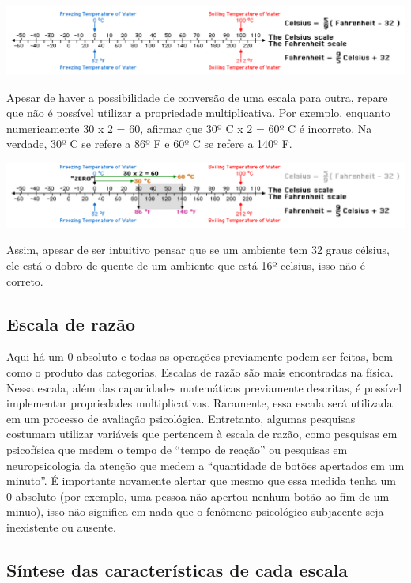 \documentclass[
]{book}
\begin{document}
\includegraphics{./img/cap_escala_medida_farenheit1.png}

Apesar de haver a possibilidade de conversão de uma escala para outra,
repare que não é possível utilizar a propriedade multiplicativa. Por
exemplo, enquanto numericamente 30 x 2 = 60, afirmar que 30º C x 2 = 60º
C é incorreto. Na verdade, 30º C se refere a 86º F e 60º C se refere a
140º F.

\includegraphics{./img/cap_escala_medida_farenheit2.png}

Assim, apesar de ser intuitivo pensar que se um ambiente tem 32 graus
célsius, ele está o dobro de quente de um ambiente que está 16º celsius,
isso não é correto.

\hypertarget{escala-de-razuxe3o}{%
\subsection{Escala de razão}\label{escala-de-razuxe3o}}

Aqui há um 0 absoluto e todas as operações previamente podem ser feitas,
bem como o produto das categorias. Escalas de razão são mais encontradas
na física. Nessa escala, além das capacidades matemáticas previamente
descritas, é possível implementar propriedades multiplicativas.
Raramente, essa escala será utilizada em um processo de avaliação
psicológica. Entretanto, algumas pesquisas costumam utilizar variáveis
que pertencem à escala de razão, como pesquisas em psicofísica que medem
o tempo de ``tempo de reação'' ou pesquisas em neuropsicologia da
atenção que medem a ``quantidade de botões apertados em um minuto''. É
importante novamente alertar que mesmo que essa medida tenha um 0
absoluto (por exemplo, uma pessoa não apertou nenhum botão ao fim de um
minuo), isso não significa em nada que o fenômeno psicológico subjacente
seja inexistente ou ausente.

\hypertarget{suxedntese-das-caracteruxedsticas-de-cada-escala}{%
\subsection{Síntese das características de cada
escala}\label{suxedntese-das-caracteruxedsticas-de-cada-escala}}
\end{document}
